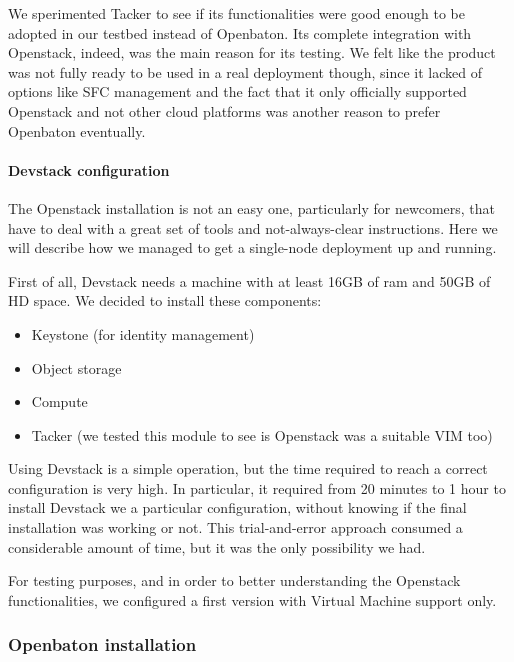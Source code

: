 We sperimented Tacker to see if its functionalities were good enough to be
adopted in our testbed instead of Openbaton. Its complete integration with
Openstack, indeed, was the main reason for its testing. We felt like the product
was not fully ready to be used in a real deployment though, since it lacked of
options like SFC management and the fact that it only officially supported
Openstack and not other cloud platforms was another reason to prefer Openbaton
eventually.

\paragraph*{Devstack configuration}
The Openstack installation is not an easy one, particularly for newcomers, that 
have to deal with a great set of tools and not-always-clear instructions. Here 
we will describe how we managed to get a single-node deployment up and running.

First of all, Devstack needs a machine with at least 16GB of ram and 50GB of HD 
space.
We decided to install these components:
\begin{itemize}
 \item Keystone (for identity management)
 \item Object storage
 \item Compute
 \item Tacker (we tested this module to see is Openstack was a suitable VIM too)
\end{itemize}

Using Devstack is a simple operation, but the time required to reach a correct 
configuration is very high. In particular, it required from 20 minutes to 1 
hour to install Devstack we a particular configuration, without knowing if the 
final installation was working or not. This trial-and-error approach consumed a 
considerable amount of time, but it was the only possibility we had.

For testing purposes, and in order to better understanding the Openstack
functionalities, we configured a first version with Virtual Machine support
only.

\subsubsection{Openbaton installation}
